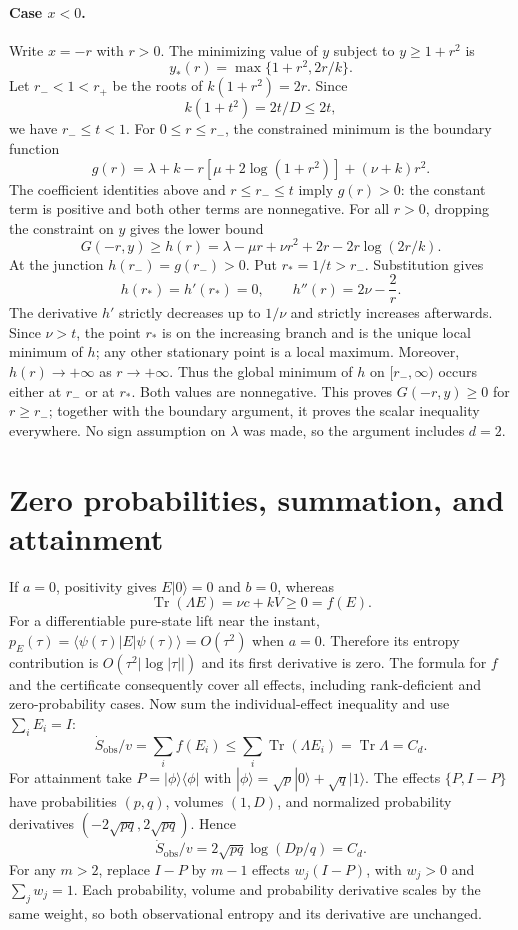 \documentclass[11pt,a4paper]{article}
\newcommand{\Tr}{\operatorname{Tr}}
\begin{document}
\paragraph{Case $x<0$.} Write $x=-r$ with $r>0$. The minimizing value of $y$ subject to $y\ge1+r^2$ is
\[y_*(r)=\max\{1+r^2,2r/k\}.\]
Let $r_-<1<r_+$ be the roots of $k(1+r^2)=2r$. Since
\[k(1+t^2)=2t/D\le2t,\]
we have $r_-\le t<1$. For $0\le r\le r_-$, the constrained minimum is the boundary function
\[g(r)=\lambda+k-r[\mu+2\log(1+r^2)]+(\nu+k)r^2.\]
The coefficient identities above and $r\le r_-\le t$ imply $g(r)>0$: the constant term is positive and both other terms are nonnegative.
For all $r>0$, dropping the constraint on $y$ gives the lower bound
\[G(-r,y)\ge h(r)=\lambda-\mu r+\nu r^2+2r-2r\log(2r/k).\]
At the junction $h(r_-)=g(r_-)>0$. Put $r_*=1/t>r_-$. Substitution gives
\[h(r_*)=h'(r_*)=0,\qquad h''(r)=2\nu-\frac2r.\]
The derivative $h'$ strictly decreases up to $1/\nu$ and strictly increases afterwards. Since $\nu>t$, the point $r_*$ is on the increasing branch and is the unique local minimum of $h$; any other stationary point is a local maximum. Moreover, $h(r)\to+\infty$ as $r\to+\infty$. Thus the global minimum of $h$ on $[r_-,\infty)$ occurs either at $r_-$ or at $r_*$. Both values are nonnegative. This proves $G(-r,y)\ge0$ for $r\ge r_-$; together with the boundary argument, it proves the scalar inequality everywhere. No sign assumption on $\lambda$ was made, so the argument includes $d=2$.
\section*{Zero probabilities, summation, and attainment}
If $a=0$, positivity gives $E|0\rangle=0$ and $b=0$, whereas
\[\Tr(\Lambda E)=\nu c+kV\ge0=f(E).\]
For a differentiable pure-state lift near the instant, $p_E(\tau)=\langle\psi(\tau)|E|\psi(\tau)\rangle=O(\tau^2)$ when $a=0$. Therefore its entropy contribution is $O(\tau^2|\log|\tau||)$ and its first derivative is zero. The formula for $f$ and the certificate consequently cover all effects, including rank-deficient and zero-probability cases.
Now sum the individual-effect inequality and use $\sum_i E_i=I$:
\[\dot S_{\mathrm{obs}}/v=\sum_i f(E_i)\le\sum_i\Tr(\Lambda E_i)=\Tr\Lambda=C_d.\]
For attainment take $P=|\phi\rangle\langle\phi|$ with $|\phi\rangle=\sqrt p|0\rangle+\sqrt q|1\rangle$. The effects $\{P,I-P\}$ have probabilities $(p,q)$, volumes $(1,D)$, and normalized probability derivatives $(-2\sqrt{pq},2\sqrt{pq})$. Hence
\[\dot S_{\mathrm{obs}}/v=2\sqrt{pq}\log(Dp/q)=C_d.\]
For any $m>2$, replace $I-P$ by $m-1$ effects $w_j(I-P)$, with $w_j>0$ and $\sum_jw_j=1$. Each probability, volume and probability derivative scales by the same weight, so both observational entropy and its derivative are unchanged.
\end{document}
